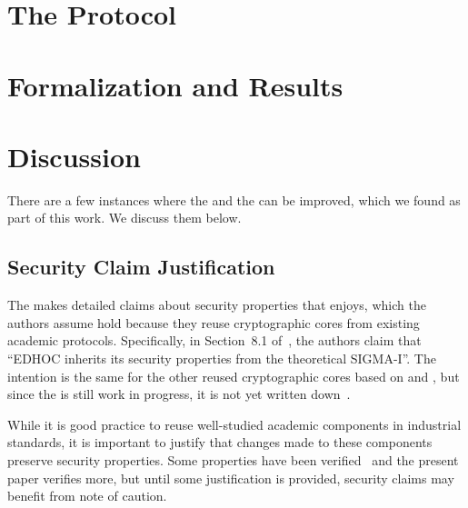 \documentclass[runningheads, envcountsame, a4paper, draft, x11names]{llncs}
\begin{document}
\section{The \mEdhoc{} Protocol}
\label{sec:edhoc}


\section{Formalization and Results}
\label{sec:formalization}


\section{Discussion}
\label{sec:discussion}
There are a few instances where the \mEdhoc{} and the \mSpec{} can be improved,
which we found as part of this work. We discuss them below.
%

\subsection{Security Claim Justification}
\label{sec:securityClaims}
The \mSpec{} makes detailed claims about security properties that \mEdhoc{}
enjoys, which the authors assume hold because they reuse cryptographic cores
from existing academic protocols.
%
Specifically, in Section~8.1 of~\cite{selander-lake-edhoc-01}, the authors
claim that ``EDHOC inherits its security properties from the theoretical
SIGMA-I''.
%
The intention is the same for the other reused cryptographic
cores based on \mOptls{} and \mNoise{}, but since the \mSpec{} is still work in
progress, it is not yet written down~\cite{personalCommunication}.
%

While it is good practice to reuse well-studied academic components in
industrial standards, it is important to justify that changes made to these
components preserve security properties.
%
Some properties have been verified~\cite{DBLP:conf/secsr/BruniJPS18} and the
present paper verifies more, but until some justification is provided, security
claims may benefit from note of caution.

\end{document}
